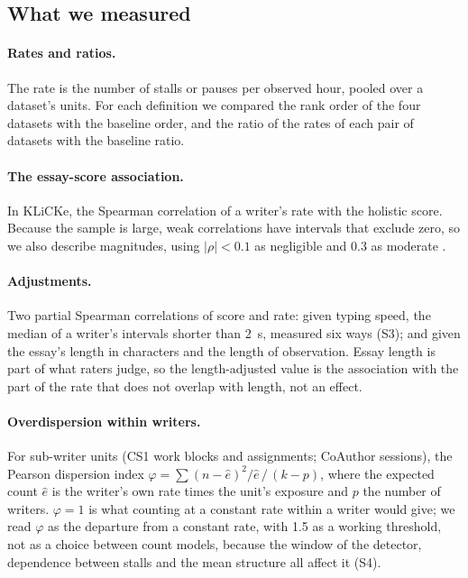\subsection{What we measured}
\label{sec:measures}

\paragraph{Rates and ratios.} The rate is the number of stalls or pauses per observed hour, pooled over a dataset's
units. For each definition we compared the rank order of the four datasets with the baseline order, and the ratio of
the rates of each pair of datasets with the baseline ratio.

\paragraph{The essay-score association.} In KLiCKe, the Spearman correlation of a writer's rate with the
holistic score. Because the sample is large, weak correlations have intervals that exclude zero, so we also describe magnitudes,
using $|\rho| < 0.1$ as negligible and 0.3 as moderate \cite{cohen1988power}.

\paragraph{Adjustments.} Two partial Spearman correlations of score and rate: given typing speed, the median of a
writer's intervals shorter than 2~s, measured six ways (S3); and given the essay's length in characters and the length
of observation. Essay length is part of what raters judge, so the length-adjusted value is the association with the
part of the rate that does not overlap with length, not an effect.

\paragraph{Overdispersion within writers.} For sub-writer units (CS1 work blocks and assignments; CoAuthor sessions),
the Pearson dispersion index $\varphi = \sum (n - \hat e)^2 / \hat e \,/\, (k - p)$, where the expected count $\hat e$ is
the writer's own rate times the unit's exposure and $p$ the number of writers. $\varphi = 1$ is what counting at a
constant rate within a writer would give; we read $\varphi$ as the departure from a constant rate, with 1.5 as a
working threshold, not as a choice between count models, because the window of the detector, dependence between
stalls and the mean structure all affect it (S4).

